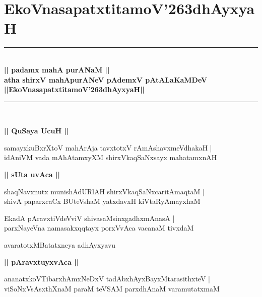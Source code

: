 \documentclass[twoside,12pt,openright]{book}
\def\S{\char'263}
\newcounter{shloka}[chapter]
\def\uvaca#1{\centerline{{\large\textbf{#1}}}}
\begin{document}

\frontmatter

\tableofcontents

\mainmatter
\begin{center}

\end{center}
\chapter{EkoVnasapatxtitamoV\S dhAyxyaH}
\begin{center}
\rule{2cm}{1pt}\\[.5cm]
{\huge\bfseries || padamx mahA purANaM ||}\\[.3cm]
{\Large\bfseries  atha shirxV mahApurANeV pAdemxV pAtALaKaMDeV }\\[.3cm]
{\LARGE\bfseries ||EkoVnasapatxtitamoV\S dhAyxyaH||}\\[.3cm]
\rule{2cm}{1pt}\\
\end{center}
\uvaca{|| QuSaya UcuH ||}

\begin{shloka}%
samayxkuBxrXtoV mahArAja tavxtotxV rAmAshavxmeVdhakaH |\\
idAniVM vada mAhAtamxyXM shirxVkaqSaNxsayx mahatamxnAH
\end{shloka}

\uvaca{|| sUta uvAca ||}

\begin{shloka}%
shaqNavxnutx munishAdURlAH shirxVkaqSaNxcaritAmaqtaM |\\
shivA paparxcaCx BUteVshaM yatxdavxH kiVtaRyAmayxhaM 
\end{shloka}

\begin{shloka}%
EkadA pAravxtiVdeVviV shivasaMsinxgadhxmAnasA |\\
parxNayeVna namasakxqqtayx porxVvAca vacanaM tivxdaM 
\end{shloka}

\begin{center}
avaratotxMBatatxneya adhAyxyavu
\end{center}

\uvaca{|| pAravxtuyxvAca ||}

\begin{shloka}%
ananatxkoVTibarxhAmxNeDxV tadAbxhAyxBayxMtarasithxteV |\\
viSoNxVsAsxthXnaM paraM teVSAM parxdhAnaM varamutatxmaM 
\end{shloka}
\end{document}
